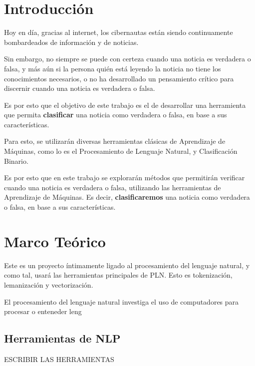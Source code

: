 \section{Introducción}
{

Hoy en día, gracias al internet, los cibernautas están siendo continuamente bombardeados de información y de noticias.

Sin embargo, no siempre se puede con certeza cuando una noticia es verdadera o falsa, y más aún si la persona quién
está leyendo la noticia no tiene los conocimientos necesarios, o no ha desarrollado un pensamiento crítico para discernir 
cuando una noticia es verdadera o falsa.

Es por esto que el objetivo de este trabajo es el de desarrollar una herramienta que permita \textbf{clasificar} una noticia como verdadera o falsa, en base a sus características.

Para esto, se utilizarán diversas herramientas clásicas de Aprendizaje de Máquinas, como lo es el Procesamiento de Lenguaje Natural, y Clasificación Binario.   


Es por esto que en este trabajo se explorarán métodos que permitirán verificar cuando una noticia es verdadera o falsa, utilizando las
herramientas de Aprendizaje de Máquinas. Es decir, \textbf{clasificaremos} una noticia como verdadera o falsa, en base a sus características.


}

\section{Marco Teórico}
{
Este es un proyecto íntimamente ligado al procesamiento del lenguaje natural, y como tal, usará las herramientas principales de PLN. Esto es tokenización, lemanización y vectorización. 

El procesamiento del lenguaje natural investiga el uso de computadores para procesar o enteneder leng

\subsection{Herramientas de NLP}
ESCRIBIR LAS HERRAMIENTAS

}

